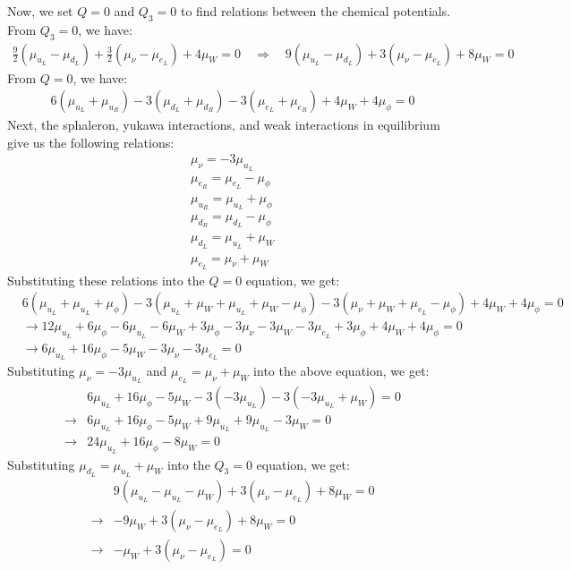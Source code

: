 Now, we set $Q=0$ and $Q_3=0$ to find relations between the chemical potentials. From $Q_3=0$, we have:
\begin{align}
    \frac{9}{2} (\mu_{u_L} - \mu_{d_L}) + \frac{3}{2}(\mu_{\nu} - \mu_{e_L}) + 4\mu_W = 0 \quad \Rightarrow \quad 9(\mu_{u_L} - \mu_{d_L}) + 3(\mu_{\nu} - \mu_{e_L}) + 8\mu_W = 0
\end{align}
From $Q=0$, we have:
\begin{align}
    6(\mu_{u_L} + \mu_{u_R}) - 3(\mu_{d_L} + \mu_{d_R}) - 3(\mu_{e_L} + \mu_{e_R}) + 4\mu_W + 4\mu_\phi = 0
\end{align}
Next, the sphaleron, yukawa interactions, and weak interactions in equilibrium give us the following relations:
\begin{align}
    \mu_\nu = -3\mu_{u_L}\\
    \mu_{e_R}= \mu_{e_L} - \mu_\phi\\
    \mu_{u_R} = \mu_{u_L} + \mu_\phi\\
    \mu_{d_R} = \mu_{d_L} - \mu_\phi\\
    \mu_{d_L} = \mu_{u_L} + \mu_W \\
    \mu_{e_L} = \mu_{\nu} + \mu_W
\end{align}
Substituting these relations into the $Q=0$ equation, we get:
\begin{align}
    &6(\mu_{u_L} + \mu_{u_L} + \mu_\phi) - 3(\mu_{u_L} + \mu_W + \mu_{u_L} + \mu_W - \mu_\phi) - 3(\mu_{\nu} + \mu_W + \mu_{e_L} - \mu_\phi) + 4\mu_W + 4\mu_\phi = 0\\
    &\to12\mu_{u_L} + 6\mu_\phi - 6\mu_{u_L} - 6\mu_W + 3\mu_\phi - 3\mu_{\nu} - 3\mu_W - 3\mu_{e_L} + 3\mu_\phi + 4\mu_W + 4\mu_\phi = 0\\
    &\to6\mu_{u_L} + 16\mu_\phi - 5\mu_W - 3\mu_{\nu} - 3\mu_{e_L} = 0
\end{align}
Substituting $\mu_{\nu} = -3\mu_{u_L}$ and $\mu_{e_L} = \mu_{\nu} + \mu_W$ into the above equation, we get:
\begin{align}
    &6\mu_{u_L} + 16\mu_\phi - 5\mu_W - 3(-3\mu_{u_L}) - 3(-3\mu_{u_L} + \mu_W) = 0\\
    \to &6\mu_{u_L} + 16\mu_\phi - 5\mu_W + 9\mu_{u_L} + 9\mu_{u_L} - 3\mu_W = 0\\
    \to &24\mu_{u_L} + 16\mu_\phi - 8\mu_W = 0
\end{align}
Substituting $\mu_{d_L} = \mu_{u_L} + \mu_W$ into the $Q_3=0$ equation, we get:
\begin{align}
    &9(\mu_{u_L} - \mu_{u_L} - \mu_W) + 3(\mu_{\nu} - \mu_{e_L}) + 8\mu_W = 0\\
    \to &-9\mu_W + 3(\mu_{\nu} - \mu_{e_L}) + 8\mu_W = 0\\
    \to &- \mu_W + 3(\mu_{\nu} - \mu_{e_L}) = 0
\end{align}
